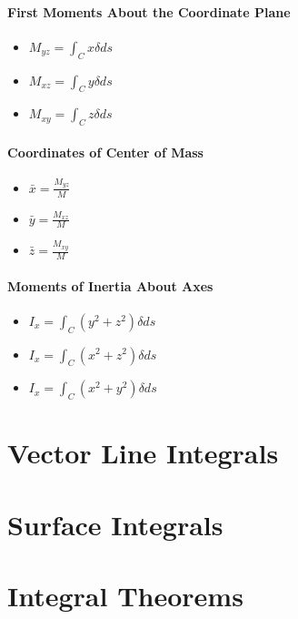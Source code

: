 \documentclass[12pt, letterpaper]{article}
\begin{document}
    \paragraph{First Moments About the Coordinate Plane}
    \begin{itemize}
        \item \(M_{yz} = \int_C x \delta ds\)
        \item \(M_{xz} = \int_C y \delta ds\)
        \item \(M_{xy} = \int_C z \delta ds\)
    \end{itemize}
    
    \paragraph{Coordinates of Center of Mass}  
    \begin{itemize}
        \item \(\bar{x} = \frac{M_{yz}}{M}\)
        \item \(\bar{y} = \frac{M_{xz}}{M}\)
        \item \(\bar{z} = \frac{M_{xy}}{M}\)
    \end{itemize}
    
    \paragraph{Moments of Inertia About Axes}
    \begin{itemize}
        \item \(I_x = \int_C (y^2 + z^2) \delta ds\)
        \item \(I_x = \int_C (x^2 + z^2) \delta ds\)
        \item \(I_x = \int_C (x^2 + y^2) \delta ds\)
    \end{itemize}
    
    
    \section{Vector Line Integrals}
    \section{Surface Integrals}
    \section{Integral Theorems}

    
    
    
    \section{}
\end{document}
